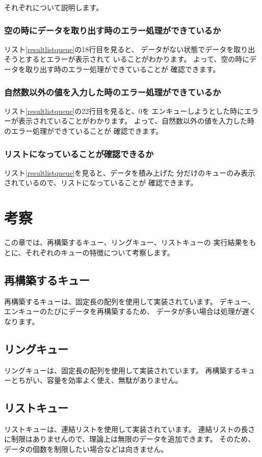 \documentclass[a4j]{jarticle}
\begin{document}
それぞれについて説明します。

\subsubsection{空の時にデータを取り出す時のエラー処理ができているか}
リスト\ref{resultlistqueue}の18行目を見ると、
データがない状態でデータを取り出そうとするとエラーが表示されて
いることがわかります。
よって、空の時にデータを取り出す時のエラー処理ができていることが
確認できます。

\subsubsection{自然数以外の値を入力した時のエラー処理ができているか}
リスト\ref{resultlistqueue}の22行目を見ると、0を
エンキューしようとした時にエラーが表示されていることがわかります。
よって、自然数以外の値を入力した時のエラー処理ができていることが
確認できます。

\subsubsection{リストになっていることが確認できるか}
リスト\ref{resultlistqueue}を見ると、データを積み上げた
分だけのキューのみ表示されているので、リストになっていることが
確認できます。


\section{考察}
この章では、再構築するキュー、リングキュー、リストキューの
実行結果をもとに、それぞれのキューの特徴について考察します。

\subsection{再構築するキュー}
再構築するキューは、固定長の配列を使用して実装されています。
デキュー、エンキューのたびにデータを再構築するため、
データが多い場合は処理が遅くなります。

\subsection{リングキュー}
リングキューは、固定長の配列を使用して実装されています。
再構築するキューとちがい、容量を効率よく使え、無駄がありません。

\subsection{リストキュー}
リストキューは、連結リストを使用して実装されています。
連結リストの長さに制限はありませんので、理論上は無限のデータを追加できます。
そのため、データの個数を制限したい場合などは向きません。
\end{document}
